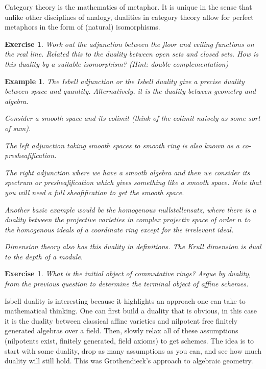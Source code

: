 \documentclass{tufte-book}
\newtheorem{example}[theorem]{Example}
\newtheorem{exercise}[theorem]{Exercise}
\begin{document}
 Category theory is the mathematics of metaphor. It is unique in the sense that unlike other disciplines of analogy, dualities in category theory allow for perfect metaphors in the form of (natural) isomorphisms.
 
 \begin{exercise}
 	Work out the adjunction between the floor and ceiling functions on the real line. Related this to the duality between open sets and closed sets. How is this duality by a suitable isomorphism? (Hint: double complementation)
 \end{exercise}
 
 \begin{example}
 	The Isbell adjunction or the Isbell duality give a precise duality between space and quantity. Alternatively, it is the duality between geometry and algebra.
 
 	Consider a smooth space and its colimit (think of the colimit naively as some sort of sum). 
 	
 	The left adjunction taking smooth spaces to smooth ring is also known as a \textit{co-presheafification}. 
 	
 	The right adjunction where we have a smooth algebra and then we consider its spectrum or \textit{presheafification} which gives something like a smooth space. Note that you will need a full sheafification to get the smooth space.
 
 	Another basic example would be the homogenous nullstellensatz, where there is a duality between the projective varieties in complex projectiv space of order $n$ to the homogenous ideals of a coordinate ring except for the irrelevant ideal.
 
 	Dimension theory also has this duality in definitions. The Krull dimension is dual to the depth of a module.
 \end{example}
 
 \begin{exercise}
 	What is the initial object of commutative rings?
 	Argue by duality, from the previous question to determine the terminal object of affine schemes.
 \end{exercise}
 
 Isbell duality is interesting because it highlights an approach one can take to mathematical thinking. One can first build a duality that is obvious, in this case it is the duality between classical affine varieties and nilpotent free finitely generated algebras over a field. Then, slowly relax all of these assumptions (nilpotents exist, finitely generated, field axioms) to get schemes. The idea is to start with some duality, drop as many assumptions as you can, and see how much duality will still hold. This was Grothendieck's approach to algebraic geometry.
 
\end{document}
